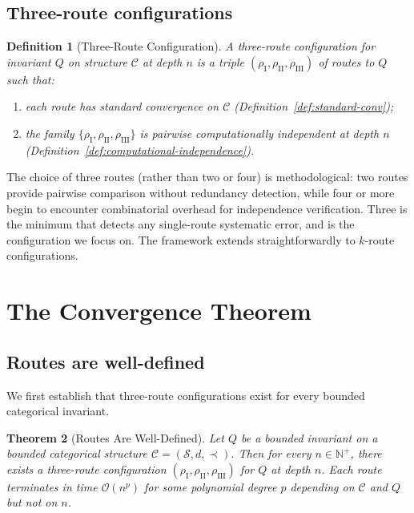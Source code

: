 \documentclass[twocolumn,11pt,a4paper]{article}
\newtheorem{theorem}{Theorem}[section]
\newtheorem{definition}[theorem]{Definition}
\newcommand{\Natural}{\mathbb{N}}
\newcommand{\Inv}{Q}
\newcommand{\RouteI}{\rho_{\mathrm{I}}}
\newcommand{\RouteII}{\rho_{\mathrm{II}}}
\newcommand{\RouteIII}{\rho_{\mathrm{III}}}
\newcommand{\StateS}{\mathcal{S}}
\newcommand{\Depth}{n}
\newcommand{\Dim}{d}
\begin{document}
\subsection{Three-route configurations}

\begin{definition}[Three-Route Configuration]
\label{def:three-route-config}
A \emph{three-route configuration} for invariant $\Inv$ on structure $\mathcal{C}$ at depth $\Depth$ is a triple $(\RouteI, \RouteII, \RouteIII)$ of routes to $\Inv$ such that:
\begin{enumerate}[nosep,leftmargin=*]
\item each route has standard convergence on $\mathcal{C}$ (Definition~\ref{def:standard-conv});
\item the family $\{\RouteI, \RouteII, \RouteIII\}$ is pairwise computationally independent at depth $\Depth$ (Definition~\ref{def:computational-independence}).
\end{enumerate}
\end{definition}

The choice of three routes (rather than two or four) is methodological: two routes provide pairwise comparison without redundancy detection, while four or more begin to encounter combinatorial overhead for independence verification. Three is the minimum that detects any single-route systematic error, and is the configuration we focus on. The framework extends straightforwardly to $k$-route configurations.

\section{The Convergence Theorem}
\label{sec:convergence}

\subsection{Routes are well-defined}

We first establish that three-route configurations exist for every bounded categorical invariant.

\begin{theorem}[Routes Are Well-Defined]
\label{thm:routes-exist}
Let $\Inv$ be a bounded invariant on a bounded categorical structure $\mathcal{C} = (\StateS, \Dim, \prec)$. Then for every $\Depth \in \Natural^+$, there exists a three-route configuration $(\RouteI, \RouteII, \RouteIII)$ for $\Inv$ at depth $\Depth$. Each route terminates in time $\mathcal{O}(\Depth^p)$ for some polynomial degree $p$ depending on $\mathcal{C}$ and $\Inv$ but not on $\Depth$.
\end{theorem}
\end{document}
